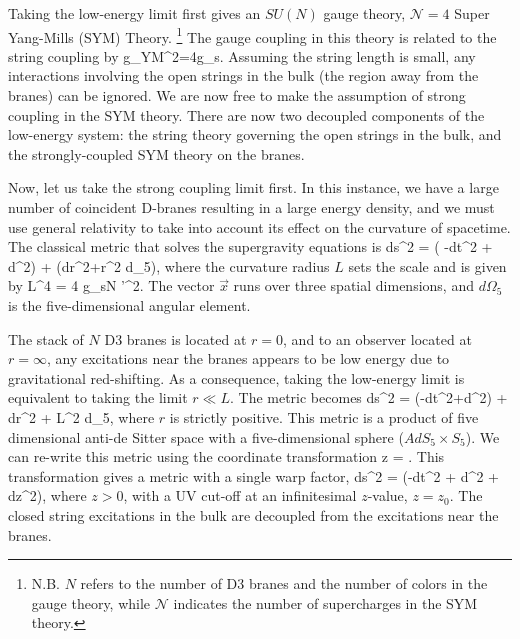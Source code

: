 Taking the low-energy limit first gives an $SU(N)$ gauge theory, $\mathcal{N} =4 $ Super Yang-Mills (SYM) Theory. 
\footnote{N.B.  $N$ refers to the number of D3 branes and the number of colors in the gauge theory, while $\mathcal{N}$ indicates the number of supercharges in the SYM theory.}
The gauge coupling in this theory is related to the string coupling by
\be
g_{YM}^2=4\pi g_s.
\label{eq:gYM}
\ee
Assuming the string length is small, any interactions involving the open strings in the bulk (the region away from the branes) can be ignored.
We are now free to make the assumption of strong coupling in the SYM theory.
There are now two decoupled components of the low-energy system: the string theory governing the open strings in the bulk, and the strongly-coupled SYM theory on the branes.

Now, let us take the strong coupling limit first. 
In this instance, we have a large number of coincident D-branes resulting in a large energy density, and we must use general relativity to take into account its effect on the curvature of spacetime.
The classical metric that solves the supergravity equations is
\be
 \label{equSGmetric}
ds^{2} = \left( -dt^{2} + d^{2}\right) + (dr^{2}+r^2 d\Omega_5),
\ee
where the curvature radius $L$ sets the scale and is given by\cite{Witten:1995im,Horowitz:1991cd}
\be
L^{4} = 4 \pi g_{s}N \alpha'^{2}.
\label{eq:L4}
\ee
The vector $\vec{x}$ runs over three spatial dimensions, and $d\Omega_5$ is the five-dimensional angular element.

The stack of $N$ D3 branes is located at $r=0$, and to an observer located at $r=\infty$, any excitations near the branes appears to be low energy due to gravitational red-shifting.
As a consequence, taking the low-energy limit is equivalent to taking the limit $r \ll L$.
The metric becomes
\be
\label{equ10drmetric}
ds^{2} =  (-dt^{2}+d^{2}) + dr^{2} + L^2 d\Omega_{5},
\ee
where $r$ is strictly positive.
This metric is a product of five dimensional anti-de Sitter space with a five-dimensional sphere ($AdS_5\times S_5$).
We can re-write this metric using the coordinate transformation
\be
z = .
\ee
This transformation gives a metric with a single warp factor,
\be
\label{equ5dzmetric}
ds^{2} = \left(-dt^{2} + d^{2} + dz^{2}\right),
\ee
where  $z>0$, with a UV cut-off at an infinitesimal $z$-value, $z=z_0$.  
The closed string excitations in the bulk are decoupled from the excitations near the branes.

